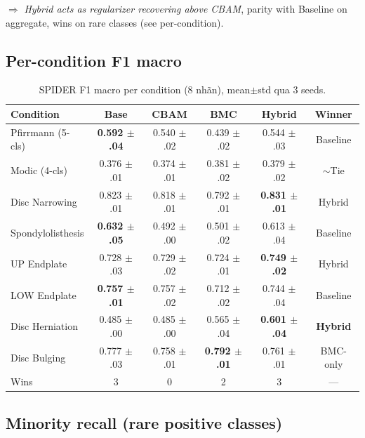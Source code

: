 \documentclass[11pt,a4paper]{article}
\newcommand{\best}[1]{\textbf{#1}}
\begin{document}
\noindent$\Rightarrow$ \emph{Hybrid acts as regularizer recovering
above CBAM}, parity with Baseline on aggregate, wins on rare classes
(see per-condition).

\subsection*{Per-condition F1 macro}

\begin{table}[h]
\centering
\caption{SPIDER F1 macro per condition (8 nhãn), mean$\pm$std qua 3 seeds.}
\small
\begin{tabular}{@{}lcccc|c@{}}
\toprule
\rowcolor{tablehdr}
Condition & Base & CBAM & BMC & Hybrid & Winner \\
\midrule
Pfirrmann (5-cls)    & \best{0.592 $\pm$ .04} & 0.540 $\pm$ .02 & 0.439 $\pm$ .02 & 0.544 $\pm$ .03 & Baseline \\
Modic (4-cls)        & 0.376 $\pm$ .01 & 0.374 $\pm$ .01 & 0.381 $\pm$ .02 & 0.379 $\pm$ .02 & ${\sim}$Tie \\
Disc Narrowing       & 0.823 $\pm$ .01 & 0.818 $\pm$ .01 & 0.792 $\pm$ .01 & \best{0.831 $\pm$ .01} & Hybrid \\
Spondylolisthesis    & \best{0.632 $\pm$ .05} & 0.492 $\pm$ .00 & 0.501 $\pm$ .02 & 0.613 $\pm$ .04 & Baseline \\
UP Endplate          & 0.728 $\pm$ .03 & 0.729 $\pm$ .02 & 0.724 $\pm$ .01 & \best{0.749 $\pm$ .02} & Hybrid \\
LOW Endplate         & \best{0.757 $\pm$ .01} & 0.757 $\pm$ .02 & 0.712 $\pm$ .02 & 0.744 $\pm$ .04 & Baseline \\
Disc Herniation      & 0.485 $\pm$ .00 & 0.485 $\pm$ .00 & 0.565 $\pm$ .04 & \best{0.601 $\pm$ .04} & \textbf{Hybrid} \\
Disc Bulging         & 0.777 $\pm$ .03 & 0.758 $\pm$ .01 & \best{0.792 $\pm$ .01} & 0.761 $\pm$ .01 & BMC-only \\
\midrule
Wins                 & 3 & 0 & 2 & 3 & --- \\
\bottomrule
\end{tabular}
\end{table}

\subsection*{Minority recall (rare positive classes)}
\end{document}
